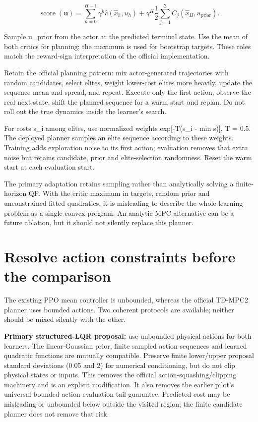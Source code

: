 \documentclass[11pt]{article}
\begin{document}
\[\operatorname{score}(\mathbf u)=\sum_{h=0}^{H-1}\gamma^h\hat c(\hat x_h,u_h)+\gamma^H\frac12\sum_{j=1}^{2}C_j(\hat x_H,u_{\mathrm{prior}}).\]

Sample u\_prior from the actor at the predicted terminal state. Use the mean of both critics for planning; the maximum is used for bootstrap targets. These roles match the reward-sign interpretation of the official implementation.

Retain the official planning pattern: mix actor-generated trajectories with random candidates, select elites, weight lower-cost elites more heavily, update the sequence mean and spread, and repeat. Execute only the first action, observe the real next state, shift the planned sequence for a warm start and replan. Do not roll out the true dynamics inside the learner's search.

For costs s\_i among elites, use normalized weights exp[-T(s\_i - min s)], T = 0.5. The deployed planner samples an elite sequence according to these weights. Training adds exploration noise to its first action; evaluation removes that extra noise but retains candidate, prior and elite-selection randomness. Reset the warm start at each evaluation start.

The primary adaptation retains sampling rather than analytically solving a finite-horizon QP. With the critic maximum in targets, random prior and unconstrained fitted quadratics, it is misleading to describe the whole learning problem as a single convex program. An analytic MPC alternative can be a future ablation, but it should not silently replace this planner.

\section{Resolve action constraints before the comparison}

The existing PPO mean controller is unbounded, whereas the official TD-MPC2 planner uses bounded actions. Two coherent protocols are available; neither should be mixed silently with the other.

\textbf{Primary structured-LQR proposal:} use unbounded physical actions for both learners. The linear-Gaussian prior, finite sampled action sequences and learned quadratic functions are mutually compatible. Preserve finite lower/upper proposal standard deviations (0.05 and 2) for numerical conditioning, but do not clip physical states or inputs. This removes the official action-squashing/clipping machinery and is an explicit modification. It also removes the earlier pilot's universal bounded-action evaluation-tail guarantee. Predicted cost may be misleading or unbounded below outside the visited region; the finite candidate planner does not remove that risk.
\end{document}
